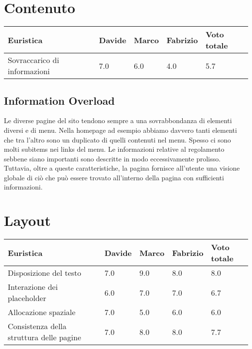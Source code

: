     \section{Contenuto}
    \begin{table}[H]
        \begin{tabular}{|l|l|l|l|l|}
        \hline \textbf{Euristica} & \textbf{Davide} & \textbf{Marco} & \textbf{Fabrizio} & \textbf{Voto totale} \\ \hline
        Sovraccarico di informazioni & 7.0 & 6.0 & 4.0 & 5.7 \\ \hline
        \end{tabular}
        \end{table}
        \subsection{Information Overload}
        Le diverse pagine del sito tendono sempre a una sovrabbondanza di
        elementi diversi e di menu. 
        Nella homepage ad esempio abbiamo davvero tanti elementi che tra l’altro
        sono un duplicato di quelli contenuti nel menu. Spesso ci sono molti
        subitems nei links del menu.
        Le informazioni relative al regolamento sebbene siano importanti sono
        descritte in modo eccessivamente prolisso.
        Tuttavia, oltre a queste caratteristiche, la pagina fornisce all'utente
        una visione globale di ciò che può essere trovato all'interno della
        pagina con sufficienti informazioni.


    \section{Layout}
        \begin{table}[H]
        \begin{tabular}{|l|l|l|l|l|}
        \hline \textbf{Euristica} & \textbf{Davide} & \textbf{Marco} & \textbf{Fabrizio} & \textbf{Voto totale} \\ \hline
        Disposizione del testo & 7.0 & 9.0 & 8.0 & 8.0 \\ \hline
        Interazione dei placeholder & 6.0 & 7.0 & 7.0 & 6.7 \\ \hline
        Allocazione spaziale & 7.0 & 5.0 & 6.0 & 6.0 \\ \hline
        Consistenza della struttura delle pagine & 7.0 & 8.0 & 8.0 & 7.7 \\ \hline
        \end{tabular}
        \end{table}
